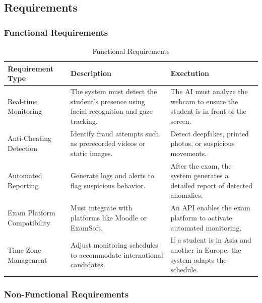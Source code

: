 \documentclass[12pt,a4paper]{article}
\begin{document}
\subsection{Requirements}

\subsubsection{Functional Requirements}

\begin{table}[H]
    \centering
    \renewcommand{\arraystretch}{1.5}
    \begin{tabular}{| p{4cm} | p{6cm} | p{6cm} |}
        \hline
        \textbf{Requirement Type} & \textbf{Description} & \textbf{Exectution} \\
        \hline
        Real-time Monitoring & The system must detect the student's presence using facial recognition and gaze tracking. & The AI must analyze the webcam to ensure the student is in front of the screen. \\
        \hline
        Anti-Cheating Detection & Identify fraud attempts such as prerecorded videos or static images. & Detect deepfakes, printed photos, or suspicious movements. \\
        \hline
        Automated Reporting & Generate logs and alerts to flag suspicious behavior. & After the exam, the system generates a detailed report of detected anomalies. \\
        \hline
        Exam Platform Compatibility & Must integrate with platforms like Moodle or ExamSoft. & An API enables the exam platform to activate automated monitoring. \\
        \hline
        Time Zone Management & Adjust monitoring schedules to accommodate international candidates. & If a student is in Asia and another in Europe, the system adapts the schedule. \\
        \hline
    \end{tabular}
    \caption{Functional Requirements}
\end{table}


\subsubsection{Non-Functional Requirements}
\end{document}
